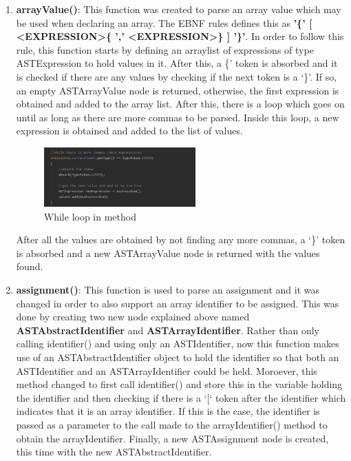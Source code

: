 \documentclass{article}
\begin{document}
\begin{enumerate}
	\item \textbf{arrayValue()}: This function was created to parse an array value which may be used when declaring an array. The EBNF rules defines this as \textbf{'\{' [ \textless EXPRESSION\textgreater \{ ',' \textless EXPRESSION\textgreater \} ] '\}'}. In order to follow this rule, this function starts by defining an arraylist of expressions of type ASTExpression to hold values in it. After this, a \{' token is absorbed and it is checked if there are any values by checking if the next token is a `\}'. If so, an empty ASTArrayValue node is returned, otherwise, the first expression is obtained and added to the array list. After this, there is a loop which goes on until as long as there are more commas to be parsed. Inside this loop, a new expression is obtained and added to the list of values. 
	
	\begin{figure}[H]
					\centering
			 			\includegraphics[width=0.55\textwidth]{astarrayvaluewhile.png}
			  			\caption{While loop in method}
			  			\label{fig:astassignment}
					\end{figure}
					
	After all the values are obtained by not finding any more commas, a `\}' token is absorbed and a new ASTArrayValue node is returned with the values found.
	

				\item \textbf{assignment()}: This function is used to parse an assignment and it was changed in order to also support an array identifier to be assigned. This was done by creating two new node explained above named \textbf{ASTAbstractIdentifier} and \textbf{ASTArrayIdentifier}. Rather than only calling identifier() and using only an ASTIdentifier, now this function makes use of an ASTAbstractIdentifier object to hold the identifier so that both an ASTIdentifier and an ASTArrayIdentifier could be held. Moroever, this method changed to first call identifier() and store this in the variable holding the identifier and then checking if there is a `[` token after the identifier which indicates that it is an array identifier. If this is the case, the identifier is passed as a parameter to the call made to the arrayIdentifier() method to obtain the arrayIdentifier. Finally, a new ASTAssignment node is created, this time with the new ASTAbstractIdentifier.
				

\end{enumerate}
\end{document}
